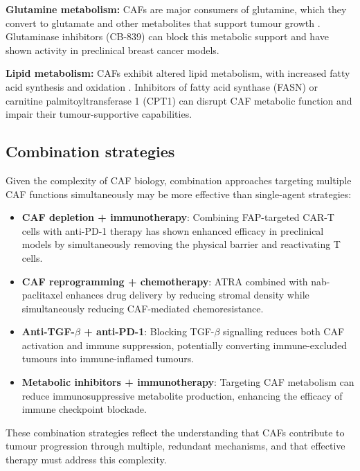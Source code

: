 \textbf{Glutamine metabolism:} CAFs are major consumers of glutamine, which they convert to glutamate and other metabolites that support tumour growth \citep{bertero2019}. Glutaminase inhibitors (CB-839) can block this metabolic support and have shown activity in preclinical breast cancer models.

\textbf{Lipid metabolism:} CAFs exhibit altered lipid metabolism, with increased fatty acid synthesis and oxidation \citep{sahai2020framework}. Inhibitors of fatty acid synthase (FASN) or carnitine palmitoyltransferase 1 (CPT1) can disrupt CAF metabolic function and impair their tumour-supportive capabilities.

\subsection{Combination strategies}

Given the complexity of CAF biology, combination approaches targeting multiple CAF functions simultaneously may be more effective than single-agent strategies:

\begin{itemize}
  \item \textbf{CAF depletion + immunotherapy}: Combining FAP-targeted CAR-T cells with anti-PD-1 therapy has shown enhanced efficacy in preclinical models by simultaneously removing the physical barrier and reactivating T cells.
  \item \textbf{CAF reprogramming + chemotherapy}: ATRA combined with nab-paclitaxel enhances drug delivery by reducing stromal density while simultaneously reducing CAF-mediated chemoresistance.
  \item \textbf{Anti-TGF-$\beta$ + anti-PD-1}: Blocking TGF-$\beta$ signalling reduces both CAF activation and immune suppression, potentially converting immune-excluded tumours into immune-inflamed tumours.
  \item \textbf{Metabolic inhibitors + immunotherapy}: Targeting CAF metabolism can reduce immunosuppressive metabolite production, enhancing the efficacy of immune checkpoint blockade.
\end{itemize}

These combination strategies reflect the understanding that CAFs contribute to tumour progression through multiple, redundant mechanisms, and that effective therapy must address this complexity.
